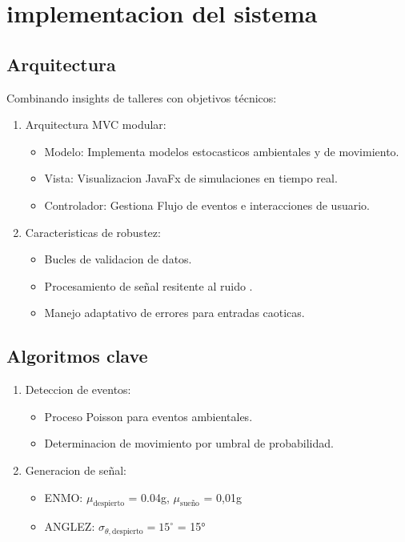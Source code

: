 \documentclass[conference]{IEEEtran}
\begin{document}
\section{implementacion del sistema}
\subsection{Arquitectura}
Combinando insights de talleres con objetivos técnicos:
\begin{enumerate}
    \item Arquitectura MVC modular: 
    \begin{itemize}
        \item Modelo: Implementa modelos estocasticos ambientales y de movimiento.
        \item Vista: Visualizacion JavaFx de simulaciones en tiempo real.
        \item Controlador: Gestiona Flujo de eventos e interacciones de usuario.
    \end{itemize}
    \item Caracteristicas de robustez: 
    \begin{itemize}
        \item Bucles de validacion de datos.
        \item Procesamiento de señal resitente al ruido .
        \item Manejo adaptativo de errores para entradas caoticas.
    \end{itemize}
\end{enumerate}
\subsection{Algoritmos clave}
\begin{enumerate}
    \item Deteccion de eventos: 
        \begin{itemize}
        \item Proceso Poisson para eventos ambientales.
        \item Determinacion de movimiento por umbral de probabilidad.
        \end{itemize}
    \item Generacion de señal:
        \begin{itemize}
        \item ENMO: \(\mu_{\text{despierto}}\) = 0.04g, \(\mu_{\text{sue\~no}}\) = 0,01g
        \item ANGLEZ: \(\sigma_{\theta,\text{despierto}} = 15^\circ\) = 15°
        \end{itemize}
\end{enumerate}
\end{document}
